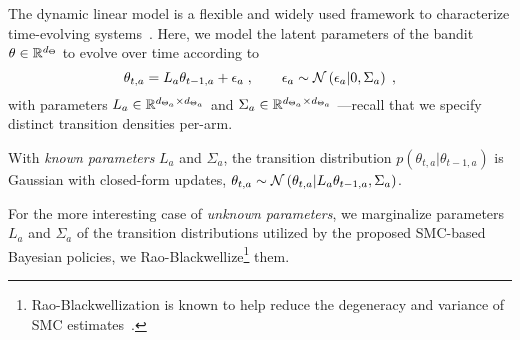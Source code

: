 
The dynamic linear model is a flexible and widely used framework to characterize time-evolving systems~\citep{b-Whittle1951, b-Box1976, b-Brockwell1991, b-Durbin2001, b-Shumway2010, b-Durbin2012}.
Here, we model the latent parameters of the bandit $\theta \in {\mathbb R}^{d_{\Theta}}$ to evolve over time according to
\begin{equation}
\theta_{t,a}=L_a \theta_{t-1,a}+\epsilon_a \;, \qquad \epsilon_a\sim\mathcal{N}\left( \epsilon_a|0, \Sigma_a\right) \; ,
\label{eq:linear_mixing_dynamics}
\end{equation}
with parameters $L_a \in {\mathbb R}^{d_{\Theta_a} \times d_{\Theta_a}}$ and $\Sigma_a \in {\mathbb R}^{d_{\Theta_a} \times d_{\Theta_a}}$
---recall that we specify distinct transition densities per-arm.

With \emph{known parameters} $L_a$ and $\Sigma_a$, the transition distribution $p(\theta_{t,a}|\theta_{t-1,a})$
is Gaussian with closed-form updates,
\ie $\theta_{t,a}\sim \mathcal{N}\left( \theta_{t,a}|L_a \theta_{t-1,a}, \Sigma_a\right) $.

For the more interesting case of \emph{unknown parameters},
we marginalize parameters $L_a$ and $\Sigma_a$ of the transition distributions
utilized by the proposed SMC-based Bayesian policies, \ie
we Rao-Blackwellize\footnote{
	Rao-Blackwellization is known to help reduce the degeneracy and variance of SMC estimates~\citep{ip-Doucet2000,ib-Djuric2010}.
} them.

